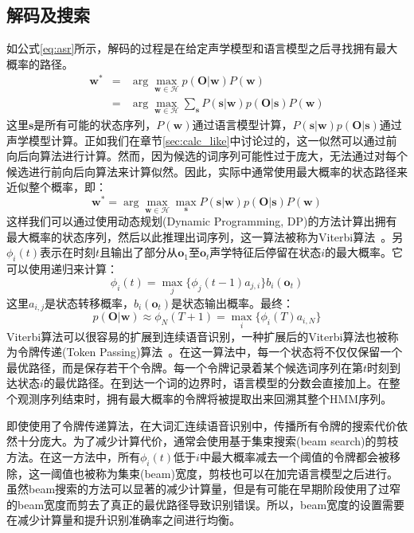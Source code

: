 \subsection{解码及搜索}
\label{sec:decode}
如公式\ref{eq:asr}所示，解码的过程是在给定声学模型和语言模型之后寻找拥有最大概率的路径。
\begin{eqnarray}
\mathbf{w}^* &=& \arg \max_{\mathbf{w} \in \mathcal{H}}p(\mathbf{O}|\mathbf{w})P(\mathbf{w}) \\
&=& \arg \max_{\mathbf{w} \in \mathcal{H}} \sum_{\mathbf{s}} P(\mathbf{s}|\mathbf{w})p(\mathbf{O}|\mathbf{s})P(\mathbf{w})
\end{eqnarray}
这里$\mathbf{s}$是所有可能的状态序列，$P(\mathbf{w})$通过语言模型计算，$P(\mathbf{s}|\mathbf{w})p(\mathbf{O}|\mathbf{s})$通过声学模型计算。正如我们在章节\ref{sec:calc_like}中讨论过的，这一似然可以通过前向后向算法进行计算。然而，因为候选的词序列可能性过于庞大，无法通过对每个候选进行前向后向算法来计算似然。因此，实际中通常使用最大概率的状态路径来近似整个概率，即：
\begin{equation}
\label{eq:decode}
\mathbf{w}^* = \arg \max_{\mathbf{w} \in \mathcal{H}} \max_{\mathbf{s}} P(\mathbf{s}|\mathbf{w})p(\mathbf{O}|\mathbf{s})P(\mathbf{w})
\end{equation}
这样我们可以通过使用动态规划(Dynamic Programming, DP)的方法计算出拥有最大概率的状态序列，然后以此推理出词序列，这一算法被称为Viterbi算法~\cite{viterbi1967error}。另$\phi_i(t)$表示在时刻$t$且输出了部分从$\mathbf{o}_1$至$\mathbf{o}_t$声学特征后停留在状态$i$的最大概率。它可以使用递归来计算：
\begin{equation}
    \phi_i(t)=\max_j\{\phi_j(t-1)a_{j,i}\}b_i(\mathbf{o}_t)
\end{equation}
这里$a_{i,j}$是状态转移概率，$b_i(\mathbf{o}_t)$是状态输出概率。最终：
\begin{equation}
    p(\mathbf{O}|\mathbf{w}) \approx \phi_{N}(T+1) = \max_i\{\phi_i(T)a_{i,N}\}
\end{equation}
Viterbi算法可以很容易的扩展到连续语音识别，一种扩展后的Viterbi算法也被称为令牌传递(Token Passing)算法~\cite{young2002htk}。在这一算法中，每一个状态将不仅仅保留一个最优路径，而是保存若干个令牌。每一个令牌记录着某个候选词序列在第$t$时刻到达状态$i$的最优路径。在到达一个词的边界时，语言模型的分数会直接加上。在整个观测序列结束时，拥有最大概率的令牌将被提取出来回溯其整个HMM序列。

即使使用了令牌传递算法，在大词汇连续语音识别中，传播所有令牌的搜索代价依然十分庞大。为了减少计算代价，通常会使用基于集束搜索(beam search)的剪枝方法。在这一方法中，所有$\phi_i(t)$低于$i$中最大概率减去一个阈值的令牌都会被移除，这一阈值也被称为集束(beam)宽度，剪枝也可以在加完语言模型之后进行。虽然beam搜索的方法可以显著的减少计算量，但是有可能在早期阶段使用了过窄的beam宽度而剪去了真正的最优路径导致识别错误。所以，beam宽度的设置需要在减少计算量和提升识别准确率之间进行均衡。

